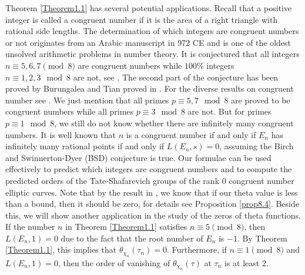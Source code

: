 \documentclass[11pt, reqno]{amsart}
\theoremstyle{plain}
\theoremstyle{definition}
\numberwithin{equation}{section}
\begin{document}

Theorem \ref{Theorem1.1} has several potential applications. Recall that a positive integer is called a congruent number if it is the area of a  right triangle with  rational side lengths.  The determination of which integers are congruent numbers or not originates from an Arabic manuscript in 972 CE and is one of the oldest unsolved arithmetic problems in number theory. It is conjectured that all integers $n\equiv 5,6,7\pmod{8}$ are congruent numbers while $100\%$ integers $n\equiv 1,2,3\mod 8$ are not, see \cite{TYZ}. The second part of the conjecture has been proved by Burungalea and Tian proved in \cite{BT2}.  
For the diverse results on congruent number see \cite{BT2,BT,T, TYZ,Smith,Khanra,Tunnell,Qin}. We just mention that all primes $p\equiv 5,7\mod 8$ are proved to be congruent numbers while all primes $p\equiv 3\mod 8$ are not. But for primes $p\equiv 1 \mod 8$, we still do not know whether there are infinitely many congruent numbers. It is well known that $n$ is a congruent number if and only if $E_n$ has infinitely many rational points if and only if $L(E_n,s)=0$, assuming the Birch and Swinnerton-Dyer (BSD) conjecture is true. Our formulae can be used effectively to predict which integers are congruent numbers and to compute the predicted orders of the Tate-Shafarevich groups of the rank 0 congruent number elliptic curves. Note that by the result in \cite{Tunnell,Qin}, we know that if our theta value is less than a bound, then it should be zero, for details see Proposition \ref{prop8.4}. Beside this, we will show another application in the study of the zeros of theta functions. If the number $n$ in Theorem \ref{Theorem1.1} satisfies $n\equiv 5\pmod 8$, then $L(E_n,1)=0$ due to the fact that the root number of $E_n$ is $-1$. By Theorem \ref{Theorem1.1}, this implies that $\theta_{\chi_n}(\tau_n)=0$. Furthermore, if  $n\equiv 1\pmod 8$ and  $L(E_n,1)=0$, then the order of vanishing  
of  $\theta_{\chi_n}(\tau)$  at $\tau_n$ is at least $2$.  
\end{document}
